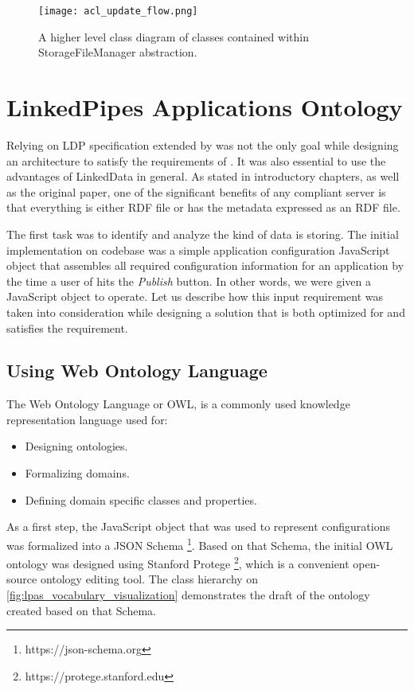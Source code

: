 \begin{figure}[h]
\centering
\texttt{[image: acl\_update\_flow.png]}
\caption{A higher level class diagram of classes contained within StorageFileManager abstraction.}
\label{fig:lps_acl_update_flow}
\end{figure}


\section{LinkedPipes Applications Ontology}

Relying on LDP specification extended by \solid{} was not the only goal while designing an architecture to satisfy the requirements of \lpa{}. It was also essential to use the advantages of LinkedData in general. As stated in introductory chapters, as well as the original paper, one of the significant benefits of any \solid{} compliant server is that everything is either RDF file or has the metadata expressed as an RDF file.  

The first task was to identify and analyze the kind of data \lpa{} is storing. The initial implementation on \lpa{} codebase was a simple application configuration JavaScript object that assembles all required configuration information for an application by the time a user of \lpa{} hits the \textit{Publish} button. In other words, we were given a JavaScript object to operate. Let us describe how this input requirement was taken into consideration while designing a solution that is both optimized for \solid{} and satisfies the requirement. 


\subsection{Using Web Ontology Language}
\label{sssec:using_web_ontology_language}

The Web Ontology Language or OWL, is a commonly used knowledge representation language used for:
\begin{itemize}
	\item Designing ontologies.
	\item Formalizing domains.
	\item Defining domain specific classes and properties.
\end{itemize}

As a first step, the JavaScript object that was used to represent \lpa{} configurations was formalized into a JSON Schema \footnote{https://json-schema.org}. Based on that Schema, the initial OWL ontology was designed using Stanford Protege \footnote{https://protege.stanford.edu}, which is a convenient open-source ontology editing tool. The class hierarchy on \autoref{fig:lpas_vocabulary_visualization} demonstrates the draft of the ontology created based on that Schema.

